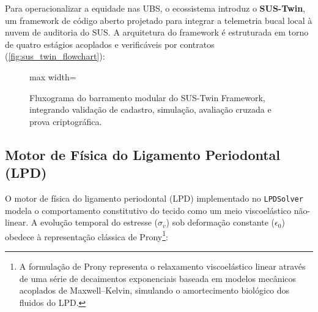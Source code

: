 Para operacionalizar a equidade nas UBS, o ecossistema introduz o
\textbf{SUS-Twin}, um framework de código aberto projetado para
integrar a telemetria bucal local à nuvem de auditoria do SUS. A
arquitetura do framework é estruturada em torno de quatro estágios
acoplados e verificáveis por contratos
(\autoref{fig:sus_twin_flowchart}):

\begin{figure}[htbp]
    \centering
    \begin{adjustbox}{max width=\textwidth}
    \end{adjustbox}
    \caption{Fluxograma do barramento modular do SUS-Twin Framework,
    integrando validação de cadastro, simulação, avaliação cruzada e
    prova criptográfica.}
    \label{fig:sus_twin_flowchart}
\end{figure}

\subsection{Motor de Física do Ligamento Periodontal (LPD)}

O motor de física do ligamento periodontal (LPD) implementado no
\texttt{LPDSolver} modela o comportamento constitutivo do tecido como
um meio viscoelástico não-linear. A evolução temporal do estresse
($\sigma_v$) sob deformação constante ($\epsilon_0$) obedece à
representação clássica de Prony\footnote{A formulação de Prony
representa o relaxamento viscoelástico linear através de uma série de
decaimentos exponenciais baseada em modelos mecânicos acoplados de
Maxwell--Kelvin, simulando o amortecimento biológico dos fluidos do
LPD.}:

